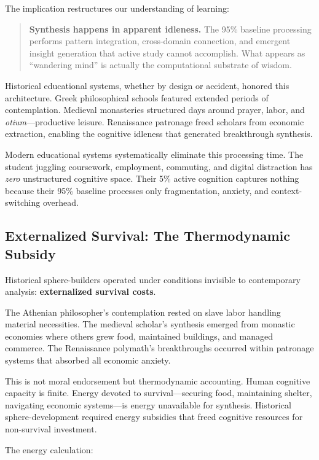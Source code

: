 The implication restructures our understanding of learning:

\begin{quote}
\textbf{Synthesis happens in apparent idleness.} The 95\% baseline processing performs pattern integration, cross-domain connection, and emergent insight generation that active study cannot accomplish. What appears as ``wandering mind'' is actually the computational substrate of wisdom.
\end{quote}

Historical educational systems, whether by design or accident, honored this architecture. Greek philosophical schools featured extended periods of contemplation. Medieval monasteries structured days around prayer, labor, and \textit{otium}---productive leisure. Renaissance patronage freed scholars from economic extraction, enabling the cognitive idleness that generated breakthrough synthesis.

Modern educational systems systematically eliminate this processing time. The student juggling coursework, employment, commuting, and digital distraction has \textit{zero} unstructured cognitive space. Their 5\% active cognition captures nothing because their 95\% baseline processes only fragmentation, anxiety, and context-switching overhead.

\subsection{Externalized Survival: The Thermodynamic Subsidy}

Historical sphere-builders operated under conditions invisible to contemporary analysis: \textbf{externalized survival costs}.

The Athenian philosopher's contemplation rested on slave labor handling material necessities. The medieval scholar's synthesis emerged from monastic economies where others grew food, maintained buildings, and managed commerce. The Renaissance polymath's breakthroughs occurred within patronage systems that absorbed all economic anxiety.

This is not moral endorsement but thermodynamic accounting. Human cognitive capacity is finite. Energy devoted to survival---securing food, maintaining shelter, navigating economic systems---is energy unavailable for synthesis. Historical sphere-development required energy subsidies that freed cognitive resources for non-survival investment.

The energy calculation:

